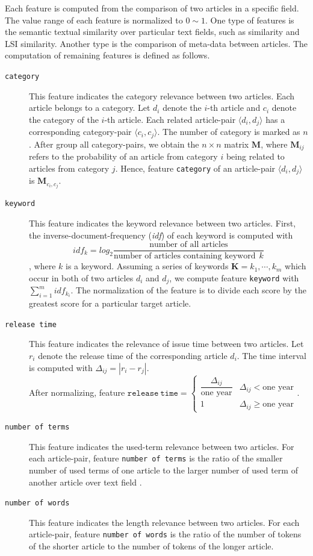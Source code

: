 Each feature is computed from the comparison of two articles in a specific field. The value range of each feature is normalized to $0 \sim 1$. One type of features is the semantic textual similarity over particular text fields, such as \tfidf{} similarity and LSI similarity. Another type is the comparison of meta-data between articles. The computation of remaining features is defined as follows.
\begin{description}
    \item[\texttt{category}] This feature indicates the category relevance between two articles. Each article belongs to a category. Let $d_i$ denote the $i$-th article and $c_i$ denote the category of the $i$-th article. Each related article-pair $\langle d_i, d_j \rangle$ has a corresponding category-pair $\langle c_i, c_j \rangle$. The number of category is marked as $n$. After group all category-pairs, we obtain the $n \times n$ matrix $\mathbf{M}$, where $\mathbf{M}_{ij}$ refers to the probability of an article from category $i$ being related to articles from category $j$. Hence, feature \texttt{category} of an article-pair $\langle d_i, d_j \rangle$ is $\mathbf{M}_{c_i,c_j}$.

    \item[\texttt{keyword}] This feature indicates the keyword relevance between two articles. First, the inverse-document-frequency (\textit{idf}) of each keyword is computed with $$idf_k=log_2 \dfrac{\text{number of all articles}}{\text{number of articles containing keyword}~~k}$$, where $k$ is a keyword. Assuming a series of keywords $\mathbf{K}={k_1, \cdots, k_m}$ which occur in both of two articles $d_i$ and $d_j$, we compute feature \texttt{keyword} with $\sum_{i=1}^{m} idf_{k_i}$. The normalization of the feature is to divide each score by the greatest score for a particular target article. 
        
    \item[\texttt{release time}] This feature indicates the relevance of issue time between two articles. Let $r_i$ denote the release time of the corresponding article $d_i$. The time interval is computed with $\Delta_{ij}=|r_i - r_j|$. \\ After normalizing, feature $\mathtt{release~time} = \begin{cases} \dfrac{\Delta_{ij}}{\text{one year}} & \Delta_{ij} < \text{one year} \\ 1& \Delta_{ij} \ge \text{one year} \end{cases}$.
    
    \item[\texttt{number of terms}] This feature indicates the used-term relevance between two articles. For each article-pair, feature \texttt{number of terms} is the ratio of the smaller number of used terms of one article to the larger number of used term of another article over text field \icontent{}. 
    
    \item[\texttt{number of words}] This feature indicates the length relevance between two articles. For each article-pair, feature \texttt{number of words} is the ratio of the number of tokens of the shorter article to the number of tokens of the longer article. 
\end{description}

